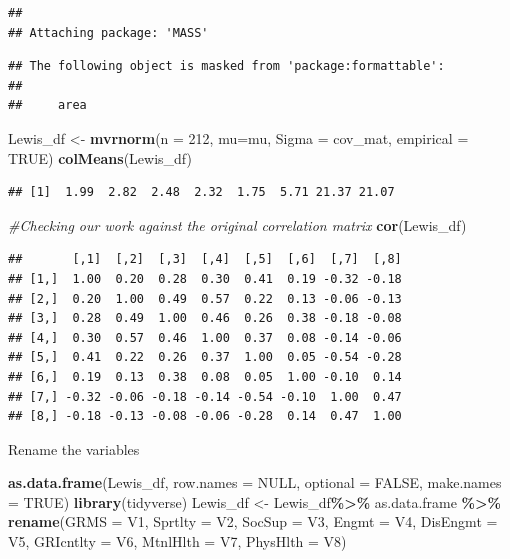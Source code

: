 \documentclass[
  11pt,
]{book}
\newenvironment{Shaded}{\begin{snugshade}}{\end{snugshade}}
\newcommand{\AttributeTok}[1]{\textcolor[rgb]{0.27,0.27,0.27}{#1}}
\newcommand{\CommentTok}[1]{\textcolor[rgb]{0.37,0.37,0.37}{\textit{#1}}}
\newcommand{\ConstantTok}[1]{\textcolor[rgb]{0.37,0.37,0.37}{#1}}
\newcommand{\DecValTok}[1]{\textcolor[rgb]{0.06,0.06,0.06}{#1}}
\newcommand{\FunctionTok}[1]{\textcolor[rgb]{0.27,0.27,0.27}{\textbf{#1}}}
\newcommand{\NormalTok}[1]{#1}
\newcommand{\OtherTok}[1]{\textcolor[rgb]{0.37,0.37,0.37}{#1}}
\newcommand{\SpecialCharTok}[1]{\textcolor[rgb]{0.43,0.43,0.43}{\textbf{#1}}}
\begin{document}
\begin{verbatim}
## 
## Attaching package: 'MASS'
\end{verbatim}

\begin{verbatim}
## The following object is masked from 'package:formattable':
## 
##     area
\end{verbatim}

\begin{Shaded}
\begin{Highlighting}[]
\NormalTok{Lewis\_df }\OtherTok{\textless{}{-}} \FunctionTok{mvrnorm}\NormalTok{(}\AttributeTok{n =} \DecValTok{212}\NormalTok{, }\AttributeTok{mu=}\NormalTok{mu, }\AttributeTok{Sigma =}\NormalTok{ cov\_mat, }\AttributeTok{empirical =} \ConstantTok{TRUE}\NormalTok{)}
\FunctionTok{colMeans}\NormalTok{(Lewis\_df)}
\end{Highlighting}
\end{Shaded}

\begin{verbatim}
## [1]  1.99  2.82  2.48  2.32  1.75  5.71 21.37 21.07
\end{verbatim}

\begin{Shaded}
\begin{Highlighting}[]
\CommentTok{\#Checking our work against the original correlation matrix}
\FunctionTok{cor}\NormalTok{(Lewis\_df)}
\end{Highlighting}
\end{Shaded}

\begin{verbatim}
##       [,1]  [,2]  [,3]  [,4]  [,5]  [,6]  [,7]  [,8]
## [1,]  1.00  0.20  0.28  0.30  0.41  0.19 -0.32 -0.18
## [2,]  0.20  1.00  0.49  0.57  0.22  0.13 -0.06 -0.13
## [3,]  0.28  0.49  1.00  0.46  0.26  0.38 -0.18 -0.08
## [4,]  0.30  0.57  0.46  1.00  0.37  0.08 -0.14 -0.06
## [5,]  0.41  0.22  0.26  0.37  1.00  0.05 -0.54 -0.28
## [6,]  0.19  0.13  0.38  0.08  0.05  1.00 -0.10  0.14
## [7,] -0.32 -0.06 -0.18 -0.14 -0.54 -0.10  1.00  0.47
## [8,] -0.18 -0.13 -0.08 -0.06 -0.28  0.14  0.47  1.00
\end{verbatim}

Rename the variables

\begin{Shaded}
\begin{Highlighting}[]
\FunctionTok{as.data.frame}\NormalTok{(Lewis\_df, }\AttributeTok{row.names =} \ConstantTok{NULL}\NormalTok{, }\AttributeTok{optional =} \ConstantTok{FALSE}\NormalTok{, }\AttributeTok{make.names =} \ConstantTok{TRUE}\NormalTok{)}
\FunctionTok{library}\NormalTok{(tidyverse)}
\NormalTok{Lewis\_df }\OtherTok{\textless{}{-}}\NormalTok{ Lewis\_df}\SpecialCharTok{\%\textgreater{}\%}
\NormalTok{  as.data.frame }\SpecialCharTok{\%\textgreater{}\%}
  \FunctionTok{rename}\NormalTok{(}\AttributeTok{GRMS =}\NormalTok{ V1, }\AttributeTok{Sprtlty =}\NormalTok{ V2, }\AttributeTok{SocSup =}\NormalTok{ V3, }\AttributeTok{Engmt =}\NormalTok{ V4, }\AttributeTok{DisEngmt =}\NormalTok{ V5, }\AttributeTok{GRIcntlty =}\NormalTok{ V6, }\AttributeTok{MtnlHlth =}\NormalTok{ V7, }\AttributeTok{PhysHlth =}\NormalTok{ V8)}
\end{Highlighting}
\end{Shaded}
\end{document}
